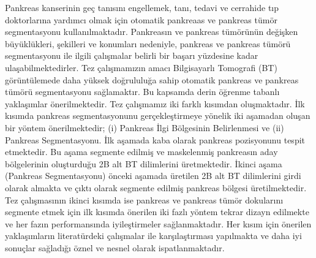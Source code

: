 \begin{tezbildirimsayfasi}
\end{tezbildirimsayfasi}

\pagestyle{plain}
\makeatother
\clearpage %

\cleardoublepage
{}
{} %
\begingroup
\null\vspace{-3.4 cm}%

\begin{spacing}{1}
	\let\origaddvspace\addvspace
	\renewcommand{\addvspace}[1]{}
	\setlength\cftbeforefigskip{16pt}	
	\tableofcontents  	
	\renewcommand{\addvspace}[1]{\origaddvspace{#1}}
\end{spacing}
\endgroup
\newpage


\begin{ozet} %
\indent Pankreas kanserinin geç tanısını engellemek, tanı, tedavi ve cerrahide tıp doktorlarına yardımcı olmak için otomatik pankreaas ve pankreas tümör segmentasyonu kullanılmaktadır. Pankreasın ve pankreas tümörünün değişken büyüklükleri, şekilleri ve konumları nedeniyle, pankreas ve pankreas tümörü segmentasyonu ile ilgili çalışmalar belirli bir başarı yüzdesine kadar ulaşabilmektedirler. Tez çalışmamızın amacı Bilgisayarlı Tomografi (BT) görüntülemede daha yüksek doğrululuğa sahip otomatik pankreas ve pankreas tümörü segmentasyonu sağlamaktır. Bu kapsamda derin öğrenme tabanlı yaklaşımlar önerilmektedir. Tez çalışmamız iki farklı kısımdan oluşmaktadır. İlk kısımda pankreas segmentasyonunu gerçekleştirmeye yönelik iki aşamadan oluşan bir yöntem önerilmektedir; (i) Pankreas İlgi Bölgesinin Belirlenmesi ve (ii) Pankreas Segmentasyonu. İlk aşamada kaba olarak pankreas pozisyonunu tespit etmektedir. Bu aşama segmente edilmiş ve maskelenmiş pankreasın aday bölgelerinin oluşturduğu 2B alt BT dilimlerini üretmektedir. İkinci aşama (Pankreas Segmentasyonu) önceki aşamada üretilen 2B alt BT dilimlerini girdi olarak almakta ve çıktı olarak segmente edilmiş pankreas bölgesi üretilmektedir. Tez çalışmasının ikinci kısımda ise pankreas ve pankreas tümör dokularını segmente etmek için ilk kısımda önerilen iki fazlı yöntem tekrar dizayn edilmekte ve her fazın performansında iyileştirmeler sağlanmaktadır. Her kısım için önerilen yaklaşımların literatürdeki çalışmalar ile karşılaştırması yapılmakta ve daha iyi sonuçlar sağladığı öznel ve nesnel olarak ispatlanmaktadır.
\end{ozet}


